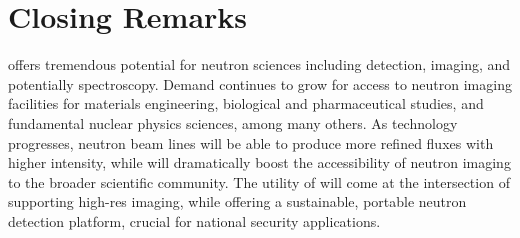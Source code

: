 \documentclass[../../main.tex]{subfiles}%
\begin{document}
%
    \section{Closing Remarks}%
    \label{sec:chapter-5:closing-remarks}%
     offers tremendous potential for neutron sciences including detection, imaging,  and potentially spectroscopy.
    Demand continues to grow for access to neutron imaging facilities for materials engineering, biological and pharmaceutical studies, and fundamental nuclear physics sciences, among many others.
    As technology progresses, neutron beam lines will be able to produce more refined fluxes with higher intensity, while  will dramatically boost the accessibility of neutron imaging to the broader scientific community.
    The utility of  will come at the intersection of supporting \gls{high-res} imaging, while offering a sustainable, portable neutron detection platform, crucial for national security applications.
\end{document}
